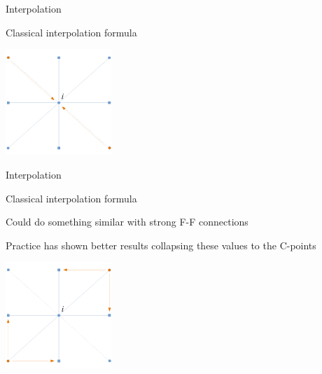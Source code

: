 \documentclass[18pt,xcolor=table]{beamer}
\begin{document}
\begin{frame}{Interpolation}
\begin{block}{Classical interpolation formula}
\end{block}
\begin{center}
\includegraphics[width=0.3\textwidth]{../figures/interpStencilWeakF}
\end{center}
\end{frame}

\begin{frame}{Interpolation}
\begin{block}{Classical interpolation formula}
\bit
\item Could do something similar with strong F-F connections
\item Practice has shown better results collapsing these values to the C-points
\eit
\end{block}
\begin{center}
\includegraphics[width=0.3\textwidth]{../figures/interpStencilStrongF}
\end{center}
\end{frame}
\end{document}
